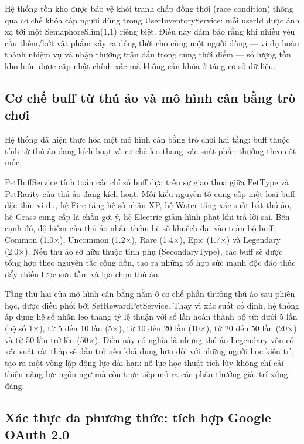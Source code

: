 Hệ thống tồn kho được bảo vệ khỏi tranh chấp đồng thời (race condition) thông qua cơ chế khóa cấp người dùng trong UserInventoryService: mỗi userId được ánh xạ tới một SemaphoreSlim(1,1) riêng biệt. Điều này đảm bảo rằng khi nhiều yêu cầu thêm/bớt vật phẩm xảy ra đồng thời cho cùng một người dùng — ví dụ hoàn thành nhiệm vụ và nhận thưởng trận đấu trong cùng thời điểm — số lượng tồn kho luôn được cập nhật chính xác mà không cần khóa ở tầng cơ sở dữ liệu.

\subsection{Cơ chế buff từ thú ảo và mô hình cân bằng trò chơi}

Hệ thống đã hiện thực hóa một mô hình cân bằng trò chơi hai tầng: buff thuộc tính từ thú ảo đang kích hoạt và cơ chế leo thang xác suất phần thưởng theo cột mốc.

PetBuffService tính toán các chỉ số buff dựa trên sự giao thoa giữa PetType và PetRarity của thú ảo đang kích hoạt. Mỗi kiểu nguyên tố cung cấp một loại buff đặc thù: ví dụ, hệ Fire tăng hệ số nhân XP, hệ Water tăng xác suất bắt thú ảo, hệ Grass cung cấp lá chắn gợi ý, hệ Electric giảm hình phạt khi trả lời sai. Bên cạnh đó, độ hiếm của thú ảo nhân thêm hệ số khuếch đại vào toàn bộ buff: Common (1.0×), Uncommon (1.2×), Rare (1.4×), Epic (1.7×) và Legendary (2.0×). Nếu thú ảo sở hữu thuộc tính phụ (SecondaryType), các buff sẽ được tổng hợp theo nguyên tắc cộng dồn, tạo ra những tổ hợp sức mạnh độc đáo thúc đẩy chiến lược sưu tầm và lựa chọn thú ảo.

Tầng thứ hai của mô hình cân bằng nằm ở cơ chế phần thưởng thú ảo sau phiên học, được điều phối bởi SetRewardPetService. Thay vì xác suất cố định, hệ thống áp dụng hệ số nhân leo thang tỷ lệ thuận với số lần hoàn thành bộ từ: dưới 5 lần (hệ số 1×), từ 5 đến 10 lần (5×), từ 10 đến 20 lần (10×), từ 20 đến 50 lần (20×) và từ 50 lần trở lên (50×). Điều này có nghĩa là những thú ảo Legendary vốn có xác suất rất thấp sẽ dần trở nên khả dụng hơn đối với những người học kiên trì, tạo ra một vòng lặp động lực dài hạn: nỗ lực học thuật tích lũy không chỉ cải thiện năng lực ngôn ngữ mà còn trực tiếp mở ra các phần thưởng giải trí xứng đáng.

\subsection{Xác thực đa phương thức: tích hợp Google OAuth 2.0}

